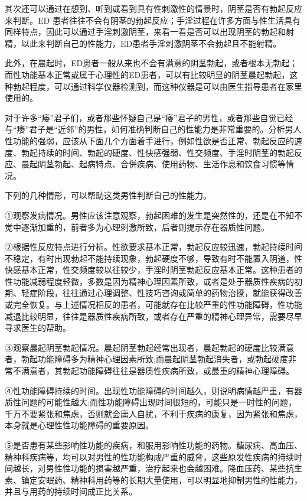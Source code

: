 \documentclass[12pt,UTF8]{ctexbook}
\begin{document}
其次还可以通过在想到、听到或看到具有性刺激性的情景时，阴茎是否有勃起反应来判断。ED 患者往往不会有阴茎的勃起反应；手淫过程在许多方面与性生活具有同样特点，因此可以通过手淫刺激阴茎，来看一看是否可以出现阴茎的勃起和射精，以此来判断自己的性能力，ED患者手淫刺激阴茎不会勃起且不能射精。

此外，在晨起时，ED患者一般从来也不会有满意的阴茎勃起，或者根本无勃起；而性功能基本正常或属于心理性的ED患者，可以有比较明显的阴茎晨起勃起，这种勃起程度，可以通过科学仪器检测到，而这种仪器是可以由医生指导患者在家里使用的。

对于许多“痿”君子们，或者那些怀疑自己是“痿”君子的男性，或者那些自觉已经与“痿”君子是“近邻”的男性，如何准确判断自己的性能力是非常重要的。分析男人性功能的强弱，应该从下面几个方面着手进行，例如性欲是否正常、勃起反应的速度、勃起持续的时间、勃起的硬度、性快感强弱、性交频度、手淫时阴茎的勃起反应、晨起阴茎勃起、起病特点、合併疾病、使用药物、生活作息和饮食习惯等情况。

下列的几种情形，可以帮助这类男性判断自己的性能力。

①观察发病情况。男性应该注意观察，勃起困难的发生是突然性的，还是在不知不觉中逐渐加重的，前者多为心理刺激所致，后者则提示存在器质性问题。

②根据性反应特点进行分析。性欲要求基本正常，勃起反应较迅速，勃起持续时间不稳定，有时出现勃起不能持续现象，勃起硬度不够，导致有时不能置入阴道，性快感基本正常，性交频度较以往较少，手淫时阴茎勃起反应基本正常。这种患者的性功能减弱程度轻微，多数是因为精神心理因素所致，或者是处于器质性疾病的初期、轻症阶段，往往通过心理调整、性技巧咨询或简单的药物治撩，就能获得改善或完全恢复。与上述情况相反的患者，可能就存在比较严重的性功能障碍，性功能减退比较明显，往往是器质性疾病所致，或者存在严重的精神心理异常，需要尽早寻求医生的帮助。

③观察晨起阴茎勃起情况。晨起阴茎勃起经常出现者，晨起勃起的硬度比较满意者，勃起功能障碍多为精神心理因素所致;而晨起阴茎勃起消失者，或勃起硬度非常不满意者，其勃起功能障碍往往是器质性疾病所致，或最重的精神心理障碍。

④性功能障碍持续的时间。出现性功能障碍的时间越久，则说明病情越严重，有器质性问题的可能性越大;而性功能障碍出现时间很短的，可能只是一时性的问题，千万不要紧张和焦虑，否则就会庸人自扰，不利于疾病的康复，因为紧张和焦虑，本身就是心理性性功能障碍的重要原因。

⑤是否患有某些影响性功能的疾病，和服用影响性功能的药物。糖尿病、高血压、精神科疾病等，均可以对男性的性功能构成严重的威脅，这些原发性疾病的持续时间越长，对男性性功能的损害越严重，治疗起来也会越困难。降血压药、某些抗生素、镇定安眠药、精神科用药等的长期大量使用，可以明显地抑制男性的性能力，并且与用药的持续时间成正比关系。
\end{document}
